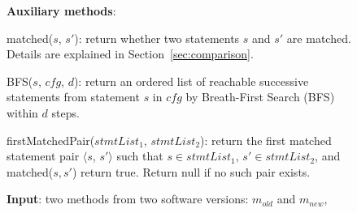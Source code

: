 \begin{figure}[t]
\textbf{Auxiliary methods}:

matched($\mathit{s}$, $\mathit{s'}$): return whether two statements
$\mathit{s}$ and $\mathit{s'}$ are matched. Details are explained
in Section~\ref{sec:comparison}.

BFS($\mathit{s}$, $\mathit{cfg}$, $\mathit{d}$): return an ordered list of reachable successive statements from statement $\mathit{s}$ in $\mathit{cfg}$ by Breath-First Search (BFS) within $\mathit{d}$ steps.

firstMatchedPair($\mathit{stmtList_1}$, $\mathit{stmtList_2}$): return the first matched statement pair $\langle$$\mathit{s}$, $\mathit{s'}$$\rangle$ such that $\mathit{s} \in \mathit{stmtList_1}$, $\mathit{s'} \in \mathit{stmtList_2}$, and matched($\mathit{s}, \mathit{s'}$) return true. Return null if no such pair exists.




\textbf{Input}: two methods from two software versions: $\mathit{m_{old}}$ and $m_{new}$,


\end{figure}
